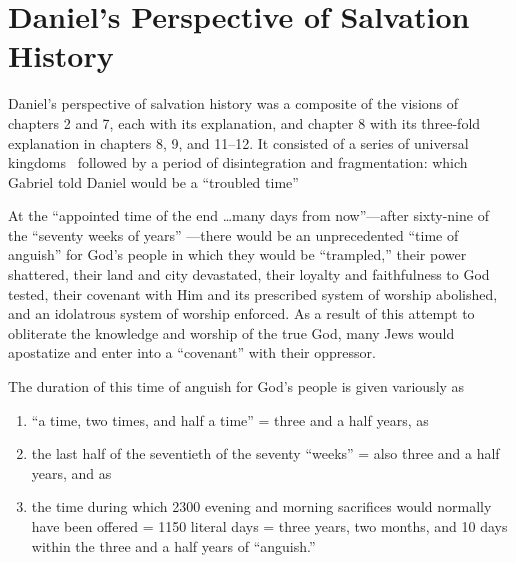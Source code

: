 \section{Daniel's Perspective of Salvation History}

Daniel's perspective of salvation history was a composite of the visions of
chapters 2 and 7, each with its explanation, and chapter 8 with
its three-fold explanation in chapters 8, 9, and 11--12. It consisted of a 
series of universal kingdoms~
followed by a period of disintegration and fragmentation:
which Gabriel told Daniel would be a ``troubled time''

At the ``appointed time of the end \ldots many days from now''---after sixty-nine
of the ``seventy weeks of years''
---there would be an unprecedented ``time of
anguish'' for God's people in which they would be ``trampled,'' their power
shattered, their land and city 
devastated, their loyalty and
faithfulness to God tested, 
their covenant with Him and its prescribed
system of worship abolished,
and an idolatrous system of worship
enforced. As a result of this attempt to obliterate the knowledge and
worship of the true God, many Jews would apostatize and enter into a
``covenant'' with their oppressor.

The duration of this time of anguish for God's people is given variously as
\begin{enumerate}
    \item ``a time, two times, and half a time'' = three and a half years,
         as
    \item the last half of the seventieth of the seventy ``weeks'' = also three and a
        half years, and as 
    \item  the time during which 2300 evening and morning
sacrifices would normally have been offered = 1150 literal days = three
        years, two months, and 10 days within 
        the three and a half years of ``anguish.''
\end{enumerate}


